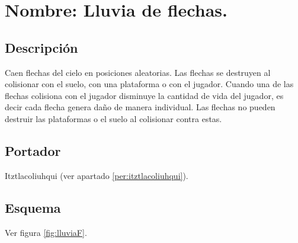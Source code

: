 \section{Nombre: Lluvia de flechas.} \label{hab.LluviaFle}
\subsection{Descripción}
Caen flechas del cielo en posiciones aleatorias. Las flechas se destruyen al colisionar con el suelo, con una plataforma o con el jugador. Cuando una de las flechas colisiona con el jugador disminuye la cantidad de vida del jugador, es decir cada flecha genera daño de manera individual. Las flechas no pueden destruir las plataformas o el suelo al colisionar contra estas.
\subsection{Portador}
Itztlacoliuhqui (ver apartado \ref{per:itztlacoliuhqui}).
\subsection{Esquema}
			Ver figura \ref{fig:lluviaF}.
